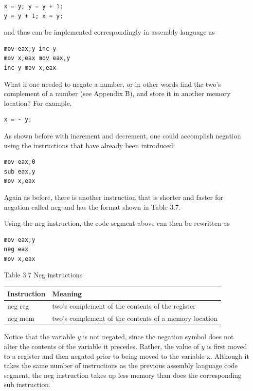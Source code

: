 \documentclass[10pt]{book}
\begin{document}
\begin{verbatim}
x = y; y = y + 1;
y = y + 1; x = y;
\end{verbatim}

and thus can be implemented correspondingly in assembly language as

\begin{verbatim}
mov eax,y inc y
mov x,eax mov eax,y
inc y mov x,eax
\end{verbatim}

What if one needed to negate a number, or in other words find the two's complement of a number (see Appendix B), and store it in another memory location? For example,

\begin{verbatim}
x = - y;
\end{verbatim}

As shown before with increment and decrement, one could accomplish negation using the instructions that have already been introduced:

\begin{verbatim}
mov eax,0
sub eax,y
mov x,eax
\end{verbatim}

Again as before, there is another instruction that is shorter and faster for negation called neg and has the format shown in Table 3.7.

Using the neg instruction, the code segment above can then be rewritten as

\begin{verbatim}
mov eax,y
neg eax
mov x,eax
\end{verbatim}

Table 3.7 Neg instructions

\begin{center}
\begin{tabular}{|l|l|}
\hline
Instruction & Meaning \\
\hline
neg reg & two's complement of the contents of the register \\
\hline
neg mem & two's complement of the contents of a memory location \\
\hline
\end{tabular}
\end{center}

Notice that the variable $y$ is not negated, since the negation symbol does not alter the contents of the variable it precedes. Rather, the value of $y$ is first moved to a register and then negated prior to being moved to the variable x. Although it takes the same number of instructions as the previous assembly language code segment, the neg instruction takes up less memory than does the corresponding sub instruction.
\end{document}
